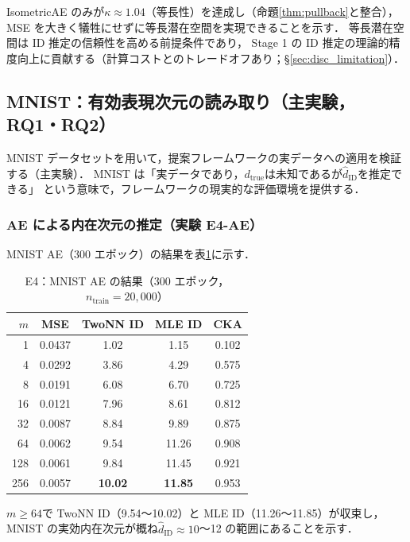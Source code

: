 \documentclass[11pt,a4paper]{jsarticle}
\newcommand{\dtrue}{d_{\mathrm{true}}}
\newcommand{\kap}{\kappa}
\begin{document}
IsometricAE のみが$\kap \approx 1.04$（等長性）を達成し（命題\ref{thm:pullback}と整合），
MSE を大きく犠牲にせずに等長潜在空間を実現できることを示す．
等長潜在空間は ID 推定の信頼性を高める前提条件であり，
Stage 1 の ID 推定の理論的精度向上に貢献する（計算コストとのトレードオフあり；§\ref{sec:disc_limitation}）．

\subsection{MNIST：有効表現次元の読み取り（主実験，RQ1・RQ2）}\label{sec:exp_mnist}

MNIST データセットを用いて，提案フレームワークの実データへの適用を検証する（主実験）．
MNIST は「実データであり，$\dtrue$は未知であるが$\hat{d}_\mathrm{ID}$を推定できる」
という意味で，フレームワークの現実的な評価環境を提供する．

\subsubsection{AE による内在次元の推定（実験 E4-AE）}

MNIST AE（300 エポック）の結果を表\ref{tab:e4_ae}に示す．

\begin{table}[H]
\centering
\caption{E4：MNIST AE の結果（300 エポック，$n_{\mathrm{train}}=20{,}000$）}
\label{tab:e4_ae}
\small
\begin{tabular}{rcccc}
\toprule
$m$ & MSE & TwoNN ID & MLE ID & CKA \\
\midrule
1   & 0.0437 & 1.02  & 1.15  & 0.102 \\
4   & 0.0292 & 3.86  & 4.29  & 0.575 \\
8   & 0.0191 & 6.08  & 6.70  & 0.725 \\
16  & 0.0121 & 7.96  & 8.61  & 0.812 \\
32  & 0.0087 & 8.84  & 9.89  & 0.875 \\
64  & 0.0062 & 9.54  & 11.26 & 0.908 \\
128 & 0.0061 & 9.84  & 11.45 & 0.921 \\
256 & 0.0057 & \textbf{10.02} & \textbf{11.85} & 0.953 \\
\bottomrule
\end{tabular}
\end{table}

$m \geq 64$で TwoNN ID（9.54〜10.02）と MLE ID（11.26〜11.85）が収束し，
MNIST の実効内在次元が概ね$\hat{d}_\mathrm{ID} \approx 10$〜12 の範囲にあることを示す．
\end{document}
